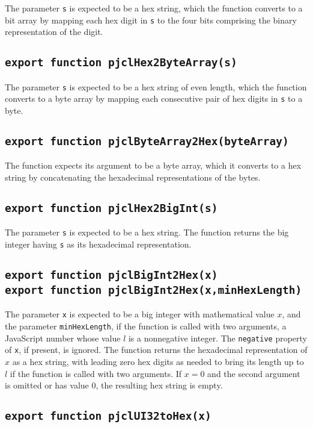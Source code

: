 \documentclass[12pt]{article}
\begin{document}
The parameter {\tt s} is expected to be a hex string, which the
function converts to a bit array by mapping each hex digit in {\tt s}
to the four bits comprising the binary representation of the digit.

\subsection{\tt export function pjclHex2ByteArray(s)}

The parameter {\tt s} is expected to be a hex string of even length, which the
function converts to a byte array by mapping each consecutive pair of
hex digits in {\tt s} to a byte.

\subsection{\tt export function pjclByteArray2Hex(byteArray)}

The function expects its argument to be a byte array, which it converts to a hex string 
by concatenating the hexadecimal representations of the bytes.

\subsection{\tt export function pjclHex2BigInt(s)}

The parameter {\tt s} is expected to be a hex string.  The function
returns the big integer having {\tt s} as its hexadecimal representation.

\subsection{\tt export function pjclBigInt2Hex(x)\\export function pjclBigInt2Hex(x,minHexLength)}

The parameter {\tt x} is expected to be a big integer with mathematical value $x$,
and the parameter {\tt minHexLength}, if the function is called with two
arguments, a JavaScript number whose value $l$ is a nonnegative integer.
The {\tt negative} property of {\tt x}, if present, is ignored.
The function returns the hexadecimal representation of $x$ as a hex string,
with leading zero hex digits as needed to bring its length up to $l$ if
the function is called with two arguments.
If $x = 0$ and the second argument is omitted or has value 0, the resulting hex string is empty.

\subsection{\tt export function pjclUI32toHex(x)}
\end{document}

